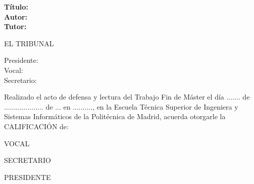 \cleardoublepage

\begin{flushleft} \large
\textbf{Título:} \TFM \\
\textbf{Autor:} \ME \\
\textbf{Tutor:} \TUTOR \\

\end{flushleft}

\hfill \break
\begin{center} \LARGE
EL TRIBUNAL \\ [1 cm]
\end{center}

\begin{flushleft} \LARGE
Presidente: \\ [1 cm]
Vocal: \\ [1 cm]
Secretario: \\ [1.5 cm]
\end{flushleft}

\large
Realizado el acto de defensa y lectura del Trabajo Fin de Máster el día
 ....... de ....................   de ... en .........., en la Escuela Técnica Superior
 de Ingeniera y Sistemas Informáticos de la Politécnica de Madrid, acuerda otorgarle la
 CALIFICACIÓN de: \\ [2 cm]

\begin{center}
 \large VOCAL \\ [2.2 cm]
\end{center}

\begin{minipage}{0.5\textwidth}
 \begin{flushleft}
 \large SECRETARIO
\end{flushleft}
\end{minipage}
\begin{minipage}{0.5\textwidth}
\begin{flushright}
 \large PRESIDENTE
\end{flushright}
\end{minipage}



